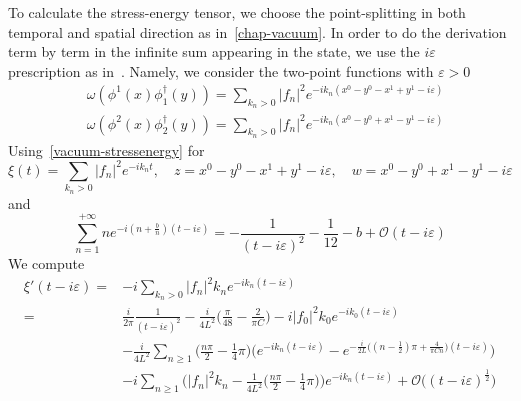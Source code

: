 %
To calculate the stress-energy tensor, we choose the point-splitting in both temporal and spatial direction as in~\cref{chap-vacuum}. 
In order to do the derivation term by term in the infinite sum appearing in the state, we use the $i\varepsilon$ prescription as in~\cite{Zahn2017}. 
Namely, we consider the two-point functions with $\varepsilon >0$
\begin{equation*}
\begin{split}
& \omega(\phi^1(x)\phi_1^\dagger(y)) = 
 \sum_{k_n>0} |f_n|^2 e^{-ik_n(x^0 - y^0 - x^1 + y^1-i\varepsilon)} \\
& \omega(\phi^2(x)\phi_2^\dagger(y)) =
\sum_{k_n>0} |f_n|^2 e^{-ik_n(x^0 - y^0 + x^1 - y^1-i\varepsilon)}
\end{split}
\end{equation*}
%
Using~\cref{vacuum-stressenergy} for 
\begin{equation*}
\xi(t) = \sum_{k_n>0} |f_n|^2 e^{-ik_n t} ,  \quad
z = x^0 - y^0 - x^1 + y^1-i\varepsilon  ,\quad
w = x^0 - y^0 + x^1 - y^1-i\varepsilon
\end{equation*}
and
\begin{equation*}
\sum_{n=1}^{+\infty} n e^{-i(n+\frac b n )(t - i\varepsilon)}
= -\frac{1}{(t-i\varepsilon)^2} - \frac{1}{12}-b + \mathcal{O}(t-i\varepsilon)
\end{equation*}
We compute
\begin{equation*}
\begin{split}
\xi'(t  - i\varepsilon)  = & -i\sum_{k_n>0}|f_n|^2k_n e^{-ik_n(t-i\varepsilon)} \\
%
= & \frac{i}{2\pi}\frac{1}{(t-i\varepsilon)^2}  
-\frac{i}{4L^2}\big(\frac{\pi}{48} - \frac{2}{\pi C} \big)
- i |f_0|^2k_0e^{-ik_0(t-i\varepsilon)}
\\
% 
& -\frac{i}{4L^2}\sum_{n\geq1}\Big(\frac{n\pi}{2} - \frac 1 4 \pi\Big)
\bigg(e^{-ik_n(t-i\varepsilon)}
-e^{-\frac{i}{2L}\big((n-\frac 1 2 )\pi + \frac{4}{\pi C n} \big)(t-i\varepsilon)} \bigg) \\
&-i \sum_{n \geq 1} \Big( |f_n|^2 k_n - \frac{1}{4L^2}\big(\frac{n\pi}{2} - \frac 1 4 \pi \big) \Big) e^{-ik_n(t-i\varepsilon)}
+\mathcal{O}\big((t-i\varepsilon)^{\frac{1}{2}}\big)
\end{split}
\end{equation*}
